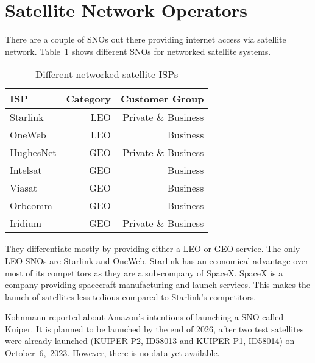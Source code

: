 \section{Satellite Network Operators} \label{sec>isps}

There are a couple of \ac{SNO}s out there providing internet access via
satellite network. Table~\ref{fig:satellite-isp} shows different \ac{SNO}s for
networked satellite systems.

\begin{table}[]
	\caption{Different networked satellite ISPs}
	\label{fig:satellite-isp}
	\begin{tabular}{lrr}
		\toprule
		ISP       & Category & Customer Group      \\
		\midrule
		Starlink  & LEO      & Private \& Business \\
		OneWeb    & LEO      & Business            \\
		HughesNet & GEO      & Private \& Business \\
		Intelsat  & GEO      & Business            \\
		Viasat    & GEO      & Business            \\
		Orbcomm   & GEO      & Business            \\
		Iridium   & GEO      & Private \& Business \\
		\bottomrule
	\end{tabular}
\end{table}

They differentiate mostly by providing either a \ac{LEO} or \ac{GEO} service.
The only \ac{LEO} \ac{SNO}s are Starlink and OneWeb. Starlink has an economical
advantage over most of its competitors as they are a sub-company of SpaceX.
SpaceX is a company providing spacecraft manufacturing and launch services.
This makes the launch of satellites less tedious compared to Starlink's
competitors.

Kohnmann \cite{Kohnmann24} reported about Amazon's intentions of launching a
\ac{SNO} called Kuiper. It is planned to be launched by the end of 2026, after
two test satellites were already launched
(\href{https://www.n2yo.com/satellite/?s=58014}{KUIPER-P2}, ID58013 and
\href{https://www.n2yo.com/satellite/?s=58013}{KUIPER-P1}, ID58014) on
October~6,~2023. However, there is no data yet available.
